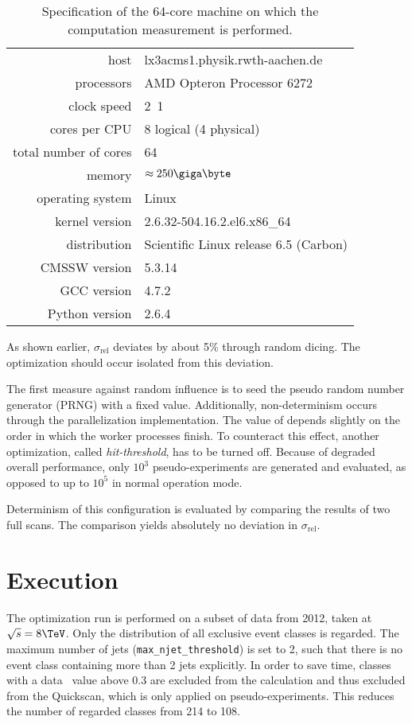 \begin{table}
	\centering
	\begin{tabular}{r|l|}
		\cline{2-2}
		host & lx3acms1.physik.rwth-aachen.de \\
		\cline{2-2}
		processors & AMD Opteron Processor 6272 \\
		clock speed & \unit{2.1}{\giga\hertz} \\
		cores per CPU & 8 logical (4 physical) \\
		total number of cores & 64 \\
		memory & $\approx \unit{250}{\giga\byte}$ \\
		\cline{2-2}
		operating system & Linux \\
		kernel version & 2.6.32-504.16.2.el6.x86\_64 \\
		distribution & Scientific Linux release 6.5 (Carbon) \\
		\cline{2-2}
		CMSSW version & 5.3.14 \\
		GCC version & 4.7.2 \\
		Python version & 2.6.4 \\
		\cline{2-2}
	\end{tabular}
	\caption{Specification of the 64-core machine on which the computation measurement is performed.}
	\label{tbl:music_machine}
\end{table}

As shown earlier, $\sigma_\mathrm{rel}$ deviates by about \unit{5}{\%} through random dicing. The optimization should occur isolated from this deviation. 

The first measure against random influence is to seed the pseudo random number generator (PRNG) with a fixed value. Additionally, non-determinism occurs through the parallelization implementation. The value of \ptilde depends slightly on the order in which the worker processes finish.
To counteract this effect, another optimization, called \emph{hit-threshold}, has to be turned off. Because of degraded overall performance, only $10^3$ pseudo-experiments are generated and evaluated, as opposed to up to $10^5$ in normal operation mode.

Determinism of this configuration is evaluated by comparing the results of two full scans. The comparison yields absolutely no deviation in $\sigma_\mathrm{rel}$.

\section{Execution}
The optimization run is performed on a subset of data from 2012, taken at ${\sqrt{s} = \unit{8}{\TeV}}$. Only the \sumpT distribution of all exclusive event classes is regarded. The maximum number of jets (\texttt{max\_njet\_threshold}) is set to 2, such that there is no event class containing more than 2 jets explicitly. 
In order to save time, classes with a data \p~value above 0.3 are excluded from the \ptilde calculation and thus excluded from the Quickscan, which is only applied on pseudo-experiments. This reduces the number of regarded classes from 214 to 108.


